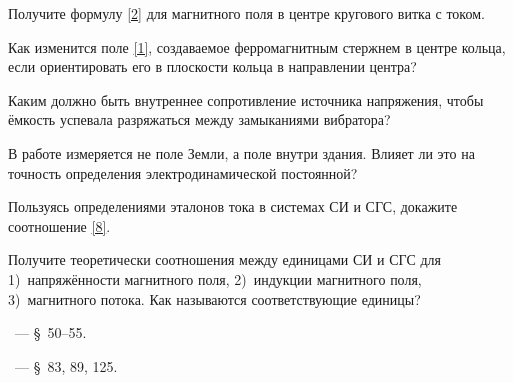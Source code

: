 \begin{lab:questions}
    \item Получите формулу \eqref{2} для магнитного поля в центре
    кругового витка с током.

    \item Как изменится поле \eqref{1}, создаваемое ферромагнитным стержнем
    в центре кольца,
    если ориентировать его в плоскости кольца в направлении центра?

    \item Каким должно быть внутреннее сопротивление источника напряжения, чтобы
ёмкость успевала разряжаться между замыканиями вибратора?

    \item В работе измеряется не поле Земли, а поле внутри здания. Влияет ли это на
точность определения электродинамической постоянной?

    \item Пользуясь определениями эталонов тока в системах СИ и СГС,
    докажите соотношение \eqref{8}.

    \item Получите теоретически соотношения между единицами
    СИ и СГС для 1)~напряжённости магнитного поля,
    2)~индукции магнитного поля, 3)~магнитного потока. Как называются
    соответствующие единицы?
\end{lab:questions}


\begin{lab:literature}
    \item \SivuhinIII~--- \S~50--55.

    \item \Kalashnikov~--- \S~83, 89, 125.
\end{lab:literature}
